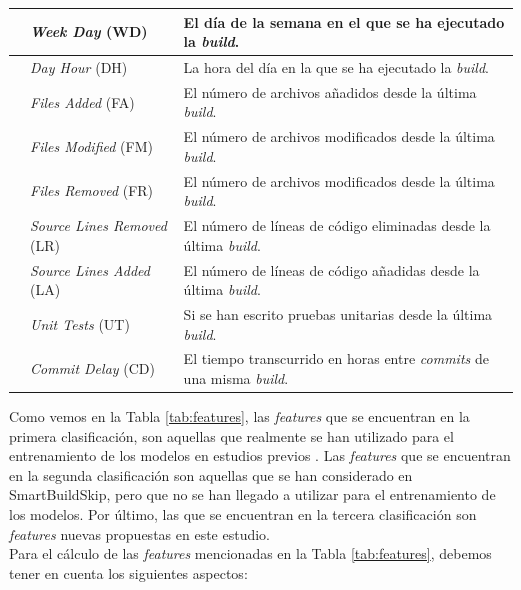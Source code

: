 \begin{table}[H]
\begin{tabular}{|>{\raggedright\arraybackslash}m{3cm}|>{\raggedright\arraybackslash}m{4cm}|>{\raggedright\arraybackslash}m{7cm}|}
        \cline{2-3}
        & \textit{Week Day} (WD) & El día de la semana en el que se ha ejecutado la \textit{build}.\\
        \cline{2-3}
        & \textit{Day Hour} (DH) & La hora del día en la que se ha ejecutado la \textit{build}.\\
        \Xhline{1pt}
        \multirow{7}{=}{Nuevas consideradas en este estudio}& \textit{Files Added} (FA) & El número de archivos añadidos desde la última \textit{build}.\\
        \cline{2-3}
        & \textit{Files Modified} (FM) & El número de archivos modificados desde la última \textit{build}.\\
        \cline{2-3}
        & \textit{Files Removed} (FR) & El número de archivos modificados desde la última \textit{build}.\\
        \cline{2-3}
        & \textit{Source Lines Removed} (LR) & El número de líneas de código eliminadas desde la última \textit{build}.\\
        \cline{2-3}
        & \textit{Source Lines Added} (LA) & El número de líneas de código añadidas desde la última \textit{build}.\\
        \cline{2-3}
        & \textit{Unit Tests} (UT) & Si se han escrito pruebas unitarias desde la última \textit{build}.\\
        \cline{2-3}
        & \textit{Commit Delay} (CD) & El tiempo transcurrido en horas entre \textit{commits} de una misma \textit{build}.\\
        \hline
    \end{tabular}
\end{table}

Como vemos en la Tabla \ref{tab:features}, las \textit{features} que se encuentran en la primera
clasificación, son aquellas que realmente se han utilizado para el entrenamiento de los modelos
en estudios previos \cite{2}. Las \textit{features} que se encuentran en la segunda clasificación
son aquellas que se han considerado en SmartBuildSkip, pero que no se han llegado a utilizar para
el entrenamiento de los modelos. Por último, las que se encuentran en la tercera clasificación son
\textit{features} nuevas propuestas en este estudio.\\

\noindent Para el cálculo de las \textit{features} mencionadas en la Tabla \ref{tab:features},
debemos tener en cuenta los siguientes aspectos:

